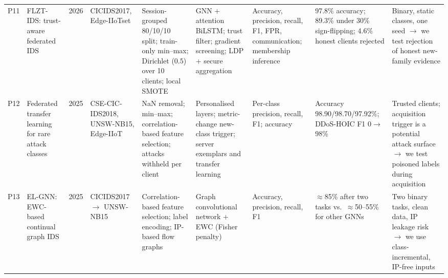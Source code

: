 \documentclass[10pt,a4paper]{article}
\begin{document}
\begin{landscape}
\begin{table}[H]
\begin{tabularx}{\linewidth}{L{0.6cm}L{2.9cm}L{0.8cm}Y Y Y Y Y Y}
P11 & FLZT-IDS: trust-aware federated IDS \cite{flzt} & 2026 & CICIDS2017, Edge-IIoTset & Session-grouped 80/10/10 split; train-only min--max; Dirichlet ($0.5$) over 10 clients; local SMOTE & GNN + attention BiLSTM; trust filter; gradient screening; LDP + secure aggregation & Accuracy, precision, recall, F1, FPR, communication; membership inference & 97.8\% accuracy; 89.3\% under 30\% sign-flipping; 4.6\% honest clients rejected & Binary, static classes, one seed $\rightarrow$ we test rejection of honest new-family evidence\\[3pt]
P12 & Federated transfer learning for rare attack classes \cite{rare} & 2025 & CSE-CIC-IDS2018, UNSW-NB15, Edge-IIoT & NaN removal; min--max; correlation-based feature selection; attacks withheld per client & Personalised layers; metric-change new-class trigger; server exemplars and transfer learning & Per-class precision, recall, F1; accuracy & Accuracy 98.90/98.70/97.92\%; DDoS-HOIC F1 0$\rightarrow$98\% & Trusted clients; acquisition trigger is a potential attack surface $\rightarrow$ we test poisoned labels during acquisition\\[3pt]
P13 & EL-GNN: EWC-based continual graph IDS \cite{elgnn} & 2025 & CICIDS2017 $\rightarrow$ UNSW-NB15 & Correlation-based feature selection; label encoding; IP-based flow graphs & Graph convolutional network + EWC (Fisher penalty) & Accuracy, precision, recall, F1 & $\approx$85\% after two tasks vs.\ $\approx$50--55\% for other GNNs & Two binary tasks, clean data, IP leakage risk $\rightarrow$ we use class-incremental, IP-free inputs\\
\bottomrule
\end{tabularx}
\end{table}
\end{landscape}
\end{document}
